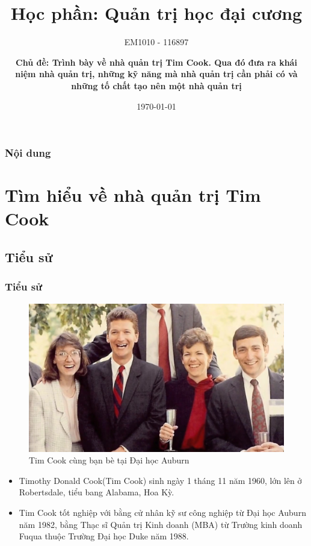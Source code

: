 \documentclass[10pt]{beamer}
\title[Nhà quản trị Tim Cook]{Học phần: \textbf{Quản trị học đại cương}}
\subtitle{EM1010 - 116897}
\author[EM1010 - 116897]{\textbf{Chủ đề: Trình bày về nhà quản trị Tim Cook. Qua đó đưa ra khái niệm nhà quản trị, những kỹ năng mà nhà quản trị cần phải có và những tố chất tạo nên một nhà quản trị}}
\institute[Nhóm 6]{\large {Nhóm 6}}
\date{\today}
\begin{document}
\frame{\titlepage\transsplitverticalout}


\begin{frame}
\label{contents}
\transblindshorizontal
\frametitle{\textbf{Nội dung}}
\tableofcontents
\end{frame}

\section{Tìm hiểu về nhà quản trị Tim Cook}

\subsection{Tiểu sử}
\begin{frame}
\transsplitverticalin
\frametitle{Tiểu sử}
\begin{figure}
\includegraphics[scale=0.17]{Figs/fig1.jpg}
\caption{Tim Cook cùng bạn bè tại Đại học Auburn}
\end{figure}
\pause
\begin{itemize}
\item Timothy Donald Cook(Tim Cook) sinh ngày 1 tháng 11 năm 1960, lớn lên ở Robertsdale, tiểu bang Alabama, Hoa Kỳ.
\pause
\item Tim Cook tốt nghiệp với bằng cử nhân kỹ sư công nghiệp từ Đại học Auburn năm 1982, bằng Thạc sĩ Quản trị Kinh doanh (MBA) từ Trường kinh doanh Fuqua thuộc Trường Đại học Duke năm 1988.
\end{itemize}



\end{frame}
\end{document}
